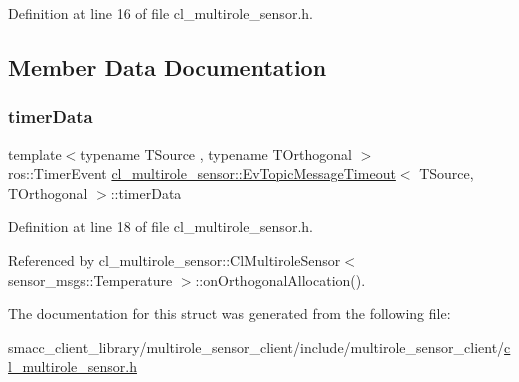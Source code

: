 Definition at line 16 of file cl\+\_\+multirole\+\_\+sensor.\+h.



\subsection{Member Data Documentation}
\mbox{\label{structcl__multirole__sensor_1_1EvTopicMessageTimeout_a56efab3b763d32bdd89ca9d737ab55dc}} 
\subsubsection{\texorpdfstring{timer\+Data}{timerData}}
{\footnotesize\ttfamily template$<$typename T\+Source , typename T\+Orthogonal $>$ \\
ros\+::\+Timer\+Event \hyperlink{structcl__multirole__sensor_1_1EvTopicMessageTimeout}{cl\+\_\+multirole\+\_\+sensor\+::\+Ev\+Topic\+Message\+Timeout}$<$ T\+Source, T\+Orthogonal $>$\+::timer\+Data}



Definition at line 18 of file cl\+\_\+multirole\+\_\+sensor.\+h.



Referenced by cl\+\_\+multirole\+\_\+sensor\+::\+Cl\+Multirole\+Sensor$<$ sensor\+\_\+msgs\+::\+Temperature $>$\+::on\+Orthogonal\+Allocation().



The documentation for this struct was generated from the following file\+:\begin{DoxyCompactItemize}
\item 
smacc\+\_\+client\+\_\+library/multirole\+\_\+sensor\+\_\+client/include/multirole\+\_\+sensor\+\_\+client/\hyperlink{cl__multirole__sensor_8h}{cl\+\_\+multirole\+\_\+sensor.\+h}\end{DoxyCompactItemize}

